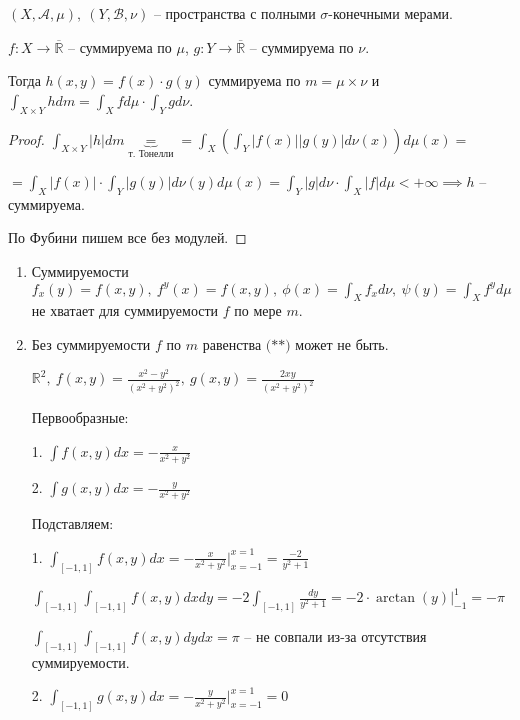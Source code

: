 \begin{consequence}
    $(X, \mathcal{A}, \mu), \ (Y, \mathcal{B}, \nu)$ -- пространства с полными $\sigma$-конечными мерами.

    $f: X \rightarrow \overline{\mathbb{R}}$ -- суммируема по $\mu$, $g: Y \rightarrow \overline{\mathbb{R}}$ -- суммируема по $\nu$. 

    Тогда $h(x, y) = f(x) \cdot g(y)$ суммируема по $m = \mu \times \nu$ и $\int_{X \times Y} {h d m} = \int_X {f d \mu} \cdot \int_Y {g d \nu}$.
\end{consequence}
\begin{proof}
    $\int_{X \times Y}{|h| d m} \underbrace{=}_{\text{т. Тонелли}} = \int_X{\left( \int_Y{|f(x)| |g(y)| d \nu(x)} \right) d \mu(x)} =$
    
    $= \int_X{ |f(x)| \cdot \int_Y {|g(y)| d \nu(y)} d \mu(x)} = \int_Y {|g| d \nu} \cdot \int_X {|f| d \mu} < +\infty \implies h$ -- суммируема.

    По Фубини пишем все без модулей.
\end{proof}

\begin{remark}
    \begin{enumerate}
        \item {
            Суммируемости $f_x(y) = f(x, y), \ f^y(x) = f(x, y), \ \phi(x) = \int_X{f_x d \nu}, \ \psi(y) = \int_X{f^y d \mu}$ не хватает для суммируемости $f$ по мере $m$.
        }
        \item {
            Без суммируемости $f$ по $m$ равенства $\textbf{(**)}$ может не быть.

            \begin{example}
                $\mathbb{R}^2, \ f(x, y) = \frac{x^2 - y^2}{(x^2 + y^2)^2}, \ g(x, y) = \frac{2xy}{(x^2 + y^2)^2}$

                Первообразные:

                1. $\int{f(x, y) d x} = -\frac{x}{x^2 + y^2}$

                2. $\int{g(x, y) d x} = -\frac{y}{x^2 + y^2}$

                Подставляем:

                1. $\int_{[-1, 1]}{f(x, y) d x} = -\frac{x}{x^2 + y^2}|^{x=1}_{x=-1} = \frac{-2}{y^2 + 1}$

                $\int_{[-1, 1]} {\int_{[-1, 1]} {f(x, y) dx}dy} = -2 \int_{[-1, 1]}{\frac{dy}{y^2 + 1}} = -2 \cdot \arctan(y) |^1_{-1} = -\pi$

                $\int_{[-1, 1]} {\int_{[-1, 1]} {f(x, y) dy}dx} = \pi$ -- не совпали из-за отсутствия суммируемости.

                2. $\int_{[-1, 1]}{g(x, y) d x} = -\frac{y}{x^2 + y^2}|^{x=1}_{x=-1} = 0$
            \end{example}
        }
    \end{enumerate}
\end{remark}

